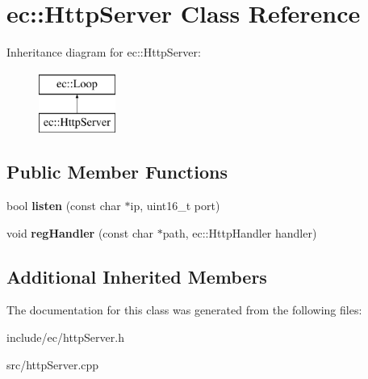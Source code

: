 \hypertarget{classec_1_1HttpServer}{\section{ec\-:\-:Http\-Server Class Reference}
\label{classec_1_1HttpServer}
}
Inheritance diagram for ec\-:\-:Http\-Server\-:\begin{figure}[H]
\begin{center}
\leavevmode
\includegraphics[height=2.000000cm]{classec_1_1HttpServer}
\end{center}
\end{figure}
\subsection*{Public Member Functions}
\begin{DoxyCompactItemize}
\item 
\hypertarget{classec_1_1HttpServer_ac56748ef31cb224abf342049f5697448}{bool {\bfseries listen} (const char $\ast$ip, uint16\-\_\-t port)}\label{classec_1_1HttpServer_ac56748ef31cb224abf342049f5697448}

\item 
\hypertarget{classec_1_1HttpServer_a0b9cf060c7a9725055e7b410cc524d56}{void {\bfseries reg\-Handler} (const char $\ast$path, ec\-::\-Http\-Handler handler)}\label{classec_1_1HttpServer_a0b9cf060c7a9725055e7b410cc524d56}

\end{DoxyCompactItemize}
\subsection*{Additional Inherited Members}


The documentation for this class was generated from the following files\-:\begin{DoxyCompactItemize}
\item 
include/ec/http\-Server.\-h\item 
src/http\-Server.\-cpp\end{DoxyCompactItemize}
